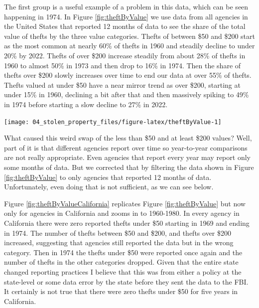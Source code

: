 \documentclass[
]{krantz}
\let\origfigure\figure
\let\endorigfigure\endfigure
\renewenvironment{figure}[1][2] {
    \expandafter\origfigure\expandafter[H]
} {
    \endorigfigure
}
\begin{document}
The first group is a useful example of a problem in this
data, which can be seen happening in 1974. In Figure
\ref{fig:theftByValue} we use data from all agencies in the
United States that reported 12 months of data to see the
share of the total value of thefts by the three value
categories. Thefts of between \$50 and \$200 start as the
most common at nearly 60\% of thefts in 1960 and steadily
decline to under 20\% by 2022. Thefts of over \$200 increase
steadily from about 28\% of thefts in 1960 to almost 50\% in
1973 and then drop to 16\% in 1974. Then the share of thefts
over \$200 slowly increases over time to end our data at
over 55\% of thefts. Thefts valued at under \$50 have a near
mirror trend as over \$200, starting at under 15\% in 1960,
declining a bit after that and then massively spiking to
49\% in 1974 before starting a slow decline to 27\% in 2022.

\begin{figure}

{\centering \texttt{[image: 04\_stolen\_property\_files/figure-latex/theftByValue-1]} 

}

\caption{The annual breakdown in total theft value by the three value categories: less than \$50, \$50-\$199, and \$200 and over, among all agencies that reported 12 months of data in that year, 1960-2023.}\label{fig:theftByValue}
\end{figure}

What caused this weird swap of the less than \$50 and at
least \$200 values? Well, part of it is that different
agencies report over time so year-to-year comparisons are
not really appropriate. Even agencies that report every year
may report only some months of data. But we corrected that
by filtering the data shown in Figure \ref{fig:theftByValue}
to only agencies that reported 12 months of data.
Unfortunately, even doing that is not sufficient, as we can
see below.

Figure \ref{fig:theftByValueCalifornia} replicates Figure
\ref{fig:theftByValue} but now only for agencies in
California and zooms in to 1960-1980. In every agency in
California there were zero reported thefts under \$50
starting in 1969 and ending in 1974. The number of thefts
between \$50 and \$200, and thefts over \$200 increased,
suggesting that agencies still reported the data but in the
wrong category. Then in 1974 the thefts under \$50 were
reported once again and the number of thefts in the other
categories dropped. Given that the entire state changed
reporting practices I believe that this was from either a
policy at the state-level or some data error by the state
before they sent the data to the FBI. It certainly is not
true that there were zero thefts under \$50 for five years
in California.
\end{document}
